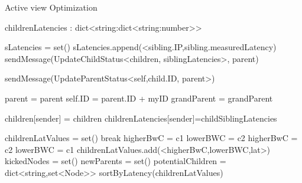 \begin{algorithm}
    \begin{algorithmic}[1]

        \caption{Active view Optimization}

        \asdstate
        \State childrenLatencies : dict<string:dict<string:number>>
        \asdend

        \State sLatencies = set()
        \State sLatencies.append(<sibling.IP,sibling.measuredLatency)
        \EndFor
        \State sendMessage(UpdateChildStatus<children, siblingLatencies>, parent)
        \EndIf
        \asdend

        \State sendMessage(UpdateParentStatus<self,child.ID, parent>)
        \EndFor
        \asdend

        \State parent = parent
        \State self.ID = parent.ID + myID
        \State grandParent = grandParent
        \EndIf
        \asdend

        \State children[sender] = children
        \State childrenLatencies[sender]=childSiblingLatencies
        \EndIf
        \asdend

        \State childrenLatValues = set()
        \State break
        \EndIf
        \State higherBwC = c1
        \State lowerBWC = c2
        \State higherBwC = c2
        \State lowerBWC = c1
        \EndIf
        \State childrenLatValues.add(<higherBwC,lowerBWC,lat>)
        \EndFor
        \EndFor
        \State kickedNodes = set()
        \State newParents = set()
        \State potentialChildren = dict<string,set<Node>>
        \State sortByLatency(childrenLatValues)


\end{algorithmic}
\end{algorithm}
